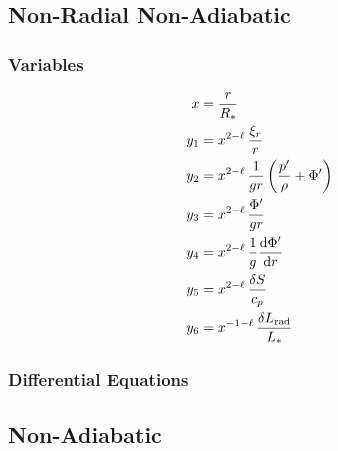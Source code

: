 \documentclass[fleqn]{article}
\newcommand{\diff}{\ensuremath{\mathrm{d}}}
\newcommand{\nabad}{\ensuremath{\nabla_{\rm ad}}}
\newcommand{\Rstar}{\ensuremath{R_{\ast}}}
\newcommand{\Lrad}{\ensuremath{L_{\rm rad}}}
\newcommand{\Lstar}{\ensuremath{L_{\ast}}}
\begin{document}


\newpage

\subsection*{Non-Radial Non-Adiabatic}

\subsubsection*{Variables}

\begin{align*}
x     &= \frac{r}{\Rstar} \\
y_{1} &= x^{2-\ell}\, \frac{\xi_{r}}{r} \\
y_{2} &= x^{2-\ell}\, \frac{1}{gr} \left( \frac{p'}{\rho} + \Phi' \right)\\
y_{3} &= x^{2-\ell}\, \frac{\Phi'}{gr}\\
y_{4} &= x^{2-\ell}\, \frac{1}{g} \frac{\diff \Phi'}{\diff r}\\
y_{5} &= x^{2-\ell}\, \frac{\delta S}{c_{p}}\\
y_{6} &= x^{-1-\ell}\, \frac{\delta \Lrad}{\Lstar}
\end{align*}

\subsubsection*{Differential Equations}

\subsection*{Non-Adiabatic}
\end{document}

